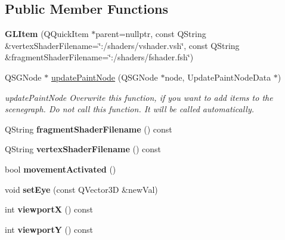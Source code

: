 \subsection*{Public Member Functions}
\begin{DoxyCompactItemize}
\item 
\mbox{\label{class_g_l_item_aae26b9d7f00f845229e3e0dfaec07392}} 
{\bfseries G\+L\+Item} (Q\+Quick\+Item $\ast$parent=nullptr, const Q\+String \&vertex\+Shader\+Filename=\char`\"{}\+:/shaders/vshader.\+vsh\char`\"{}, const Q\+String \&fragment\+Shader\+Filename=\char`\"{}\+:/shaders/fshader.\+fsh\char`\"{})
\item 
Q\+S\+G\+Node $\ast$ \mbox{\hyperlink{class_g_l_item_a3ee5b8ed5321e4b60d233328e3b89d3a}{update\+Paint\+Node}} (Q\+S\+G\+Node $\ast$node, Update\+Paint\+Node\+Data $\ast$)
\begin{DoxyCompactList}\small\item\em update\+Paint\+Node Overwrite this function, if you want to add items to the scenegraph. Do not call this function. It will be called automatically. \end{DoxyCompactList}\item 
\mbox{\label{class_g_l_item_a8b2e0c9769ceddce3e79959cce359236}} 
Q\+String {\bfseries fragment\+Shader\+Filename} () const
\item 
\mbox{\label{class_g_l_item_ac329bb38182a8921e8f83f6990366648}} 
Q\+String {\bfseries vertex\+Shader\+Filename} () const
\item 
\mbox{\label{class_g_l_item_a45485508d639ce1c0855928c59bdf7db}} 
bool {\bfseries movement\+Activated} ()
\item 
\mbox{\label{class_g_l_item_a9a731cdacee49b522f6da9f7439048dd}} 
void {\bfseries set\+Eye} (const Q\+Vector3D \&new\+Val)
\item 
\mbox{\label{class_g_l_item_ad9b8583ed12cdc4eadb5a23e3a9c0791}} 
int {\bfseries viewportX} () const
\item 
\mbox{\label{class_g_l_item_a890604fe40a634ca721a55494e69079a}} 
int {\bfseries viewportY} () const
\end{DoxyCompactItemize}
